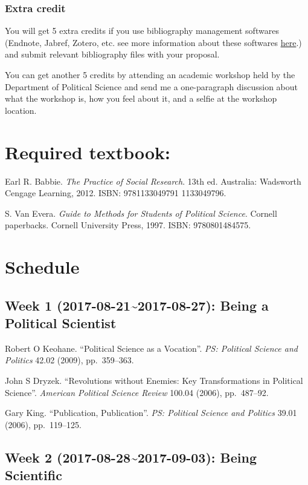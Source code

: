 \documentclass[11pt,]{article}
\theoremstyle{definition}
\theoremstyle{definition}
\theoremstyle{remark}
\begin{document}
\subsubsection{Extra credit}\label{extra-credit}

You will get 5 extra credits if you use bibliography management
softwares (Endnote, Jabref, Zotero, etc. see more information about
these softwares
\href{https://en.wikipedia.org/wiki/Comparison_of_reference_management_software}{here}.)
and submit relevant bibliography files with your proposal.

You can get another 5 credits by attending an academic workshop held by
the Department of Political Science and send me a one-paragraph
discussion about what the workshop is, how you feel about it, and a
selfie at the workshop location.

\section{Required textbook:}\label{required-textbook}

Earl R. Babbie. \emph{The Practice of Social Research}. 13th ed.
Australia: Wadsworth Cengage Learning, 2012. ISBN: 9781133049791
1133049796.

S. Van Evera. \emph{Guide to Methods for Students of Political Science}.
Cornell paperbacks. Cornell University Press, 1997. ISBN: 9780801484575.

\section{Schedule}\label{schedule}

\subsection{Week 1 (2017-08-21\textasciitilde{}2017-08-27): Being a
Political
Scientist}\label{week-1-2017-08-212017-08-27-being-a-political-scientist}

Robert O Keohane. ``Political Science as a Vocation''.
\emph{PS: Political Science and Politics} 42.02 (2009), pp.~359--363.

John S Dryzek. ``Revolutions without Enemies: Key Transformations in
Political Science''. \emph{American Political Science Review} 100.04
(2006), pp.~487--92.

Gary King. ``Publication, Publication''.
\emph{PS: Political Science and Politics} 39.01 (2006), pp.~119--125.

\subsection{Week 2 (2017-08-28\textasciitilde{}2017-09-03): Being
Scientific}\label{week-2-2017-08-282017-09-03-being-scientific}
\end{document}
